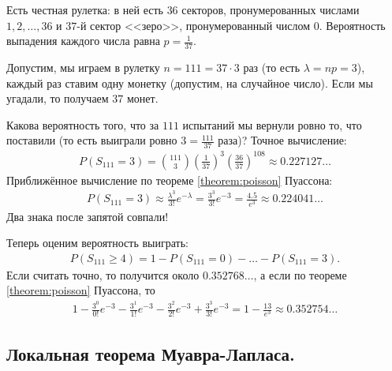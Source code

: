 \documentclass[../main.tex]{subfiles}
\begin{document}
\begin{exmpl}
 Есть честная рулетка: в ней есть $ 36 $ секторов, пронумерованных числами $ 1,2, \ldots, 36 $ и $ 37 $-й сектор <<зеро>>, пронумерованный числом $ 0 $. Вероятность выпадения каждого числа равна $ p = \frac{1}{37} $.

 Допустим, мы играем в рулетку $n = 111=37\cdot3$ раз (то есть $ \lambda = np = 3 $), каждый раз ставим одну монетку (допустим, на случайное число). Если мы угадали, то получаем $37$ монет.

 Какова вероятность того, что за $111$ испытаний мы вернули ровно то, что поставили (то есть выиграли ровно $ 3 = \frac{111}{37} $ раза)? Точное вычисление:
 \begin{align*}
  P(S_{111} = 3) = \binom {111} 3 \left( \frac{1}{37} \right)^{3} \left( \frac{36}{37} \right)^{108} \approx 0.227127\ldots
 \end{align*} Приближённое вычисление по теореме \ref{theorem:poisson} Пуассона:
 \begin{align*}
  P(S_{111} = 3) \approx \frac{\lambda^{3}}{3!}e^{-\lambda} = \frac{3^{3}}{3!} e^{-3} = \frac{4.5}{e^{3}} \approx 0.224041\ldots
 \end{align*} Два знака после запятой совпали!

 Теперь оценим вероятность выиграть:
 \begin{align*}
  P(S_{111} \geqslant 4) = 1 - P(S_{111} = 0) - \ldots - P(S_{111} = 3)
 .\end{align*} Если считать точно, то получится около $0.352768\ldots$, а если по теореме \ref{theorem:poisson} Пуассона, то
 \begin{align*}
  1 - \frac{3^{0}}{0!}e^{-3} - \frac{3^{1}}{1!}e^{-3} - \frac{3^{2}}{2!}e^{-3} + \frac{3^{3}}{3!}e^{-3} = 1 - \frac{13}{e^{3}} \approx 0.352754\ldots
 \end{align*} 
\end{exmpl}

\subsection{Локальная теорема Муавра-Лапласа.}
\end{document}
